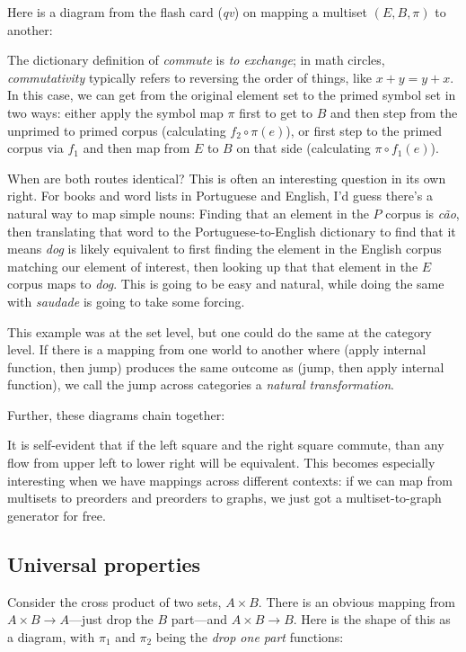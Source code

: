 \documentclass[11pt]{article}
\begin{document}
Here is a diagram
from the flash card ({\em qv}) on mapping a multiset $(E, B, \pi)$ to another:

The dictionary definition of {\em
commute} is {\em to exchange}; in math circles, {\em commutativity} typically refers to
reversing the order of things, like $x+y = y+x$. In this case, we can 
get from the original element set to the primed symbol set in two ways:
either apply the symbol map $\pi$ first to get to $B$ and then step from the unprimed to
primed corpus (calculating $f_2\circ\pi(e)$), or first step to the primed corpus via $f_1$ and then
map from $E$ to $B$ on that side (calculating $\pi\circ f_1(e)$).

When are both routes identical? This is often an interesting question in its own right.
For books and word lists in Portuguese and English, I'd guess there's a natural
way to map simple nouns: Finding that an element in the $P$ corpus is {\em cão},
then translating that word to the Portuguese-to-English dictionary to find that it means {\em dog}
is likely equivalent to first finding the element in the English corpus matching our
element of interest, then looking up that that element in the $E$ corpus maps to {\em
dog}. This is going to be easy and natural, while doing the same with {\em saudade}
is going to take some forcing.

This example was at the set level, but one could do the same at the category level.
If there is a mapping from one world to another where (apply internal function, then jump)
produces the same outcome as (jump, then apply internal function), we call the jump across
categories a {\em natural transformation}.

Further, these diagrams chain together:


It is self-evident that if the left square and the right square commute, than any flow
from upper left to lower right will be equivalent. This becomes especially interesting
when we have mappings across different contexts: if we can map from multisets to preorders
and preorders to graphs, we just got a multiset-to-graph generator for free.

\subsection{Universal properties}
Consider the cross product of two sets, $A\times B$. There is an obvious mapping from
$A\times B \to A$---just drop the $B$ part---and $A\times B \to B$. Here is the shape of this as a
diagram, with $\pi_1$ and $\pi_2$ being the {\em drop one part} functions:
\end{document}
